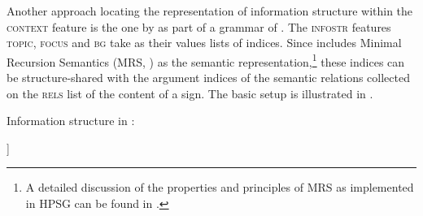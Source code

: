 \documentclass[output=paper]{langsci/langscibook}
\begin{document}
Another approach locating the representation of information structure
within the \textsc{context} feature is the one by
\cite{Paggio2009a-u} as part of a grammar of . The
\textsc{infostr} features \textsc{topic}, \textsc{focus} and
\textsc{bg} take as their values lists of indices. Since
\cite{Paggio2009a-u} includes Minimal Recursion Semantics (MRS,
\citealt{CFPS2005a}) as the semantic representation,\footnote{A detailed
  discussion of the properties and principles of MRS as implemented in
  HPSG can be found in .} these indices
can be structure-shared with the argument indices of the semantic
relations collected on the \textsc{rels} list of the content of a
sign. The basic setup is illustrated in .

\ea\label{fig:paggio-infostr}
Information structure in \cite[149]{Paggio2009a-u}:\\
        \leavevmode
    \begin{avm}
    [\tp{sign}\\
     synsem|local|context|infostr & [focus & list-of-indices\\
                                     topic & list-of-indices\\
                                     bg & list-of-indices]
    ]     
    \end{avm}
\z
\end{document}
